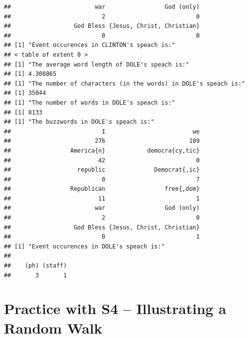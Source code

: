 \documentclass{article}\usepackage[]{graphicx}\usepackage[]{color}
\makeatletter
\newenvironment{kframe}{%
 \def\at@end@of@kframe{}%
 \ifinner\ifhmode%
  \def\at@end@of@kframe{\end{minipage}}%
  \begin{minipage}{\columnwidth}%
 \fi\fi%
 \def\FrameCommand##1{\hskip\@totalleftmargin \hskip-\fboxsep
 \colorbox{shadecolor}{##1}\hskip-\fboxsep
     \hskip-\linewidth \hskip-\@totalleftmargin \hskip\columnwidth}%
 \MakeFramed {\advance\hsize-\width
   \@totalleftmargin\z@ \linewidth\hsize
   \@setminipage}}%
 {\par\unskip\endMakeFramed%
 \at@end@of@kframe}
\newenvironment{knitrout}{}{} %
\makeatother
\begin{document}
\begin{knitrout}
\begin{kframe}
\begin{verbatim}
##                        war                 God (only) 
##                          2                          0 
##                  God Bless {Jesus, Christ, Christian} 
##                          0                          0 
## [1] "Event occurences in CLINTON's speach is:"
## < table of extent 0 >
## [1] "The average word length of DOLE's speach is:"
## [1] 4.308865
## [1] "The number of characters (in the words) in DOLE's speach is:"
## [1] 35044
## [1] "The number of words in DOLE's speach is:"
## [1] 8133
## [1] "The buzzwords in DOLE's speach is:"
##                          I                         we 
##                        276                        109 
##                 America{n}            democra{cy,tic} 
##                         42                          0 
##                   republic              Democrat{,ic} 
##                          0                          7 
##                 Republican                 free{,dom} 
##                         11                          1 
##                        war                 God (only) 
##                          2                          0 
##                  God Bless {Jesus, Christ, Christian} 
##                          0                          1 
## [1] "Event occurences in DOLE's speach is:"
## 
##    (ph) (staff) 
##       3       1
\end{verbatim}
\end{kframe}
\end{knitrout}

\section{Practice with S4 -- Illustrating a Random Walk}
\end{document}
